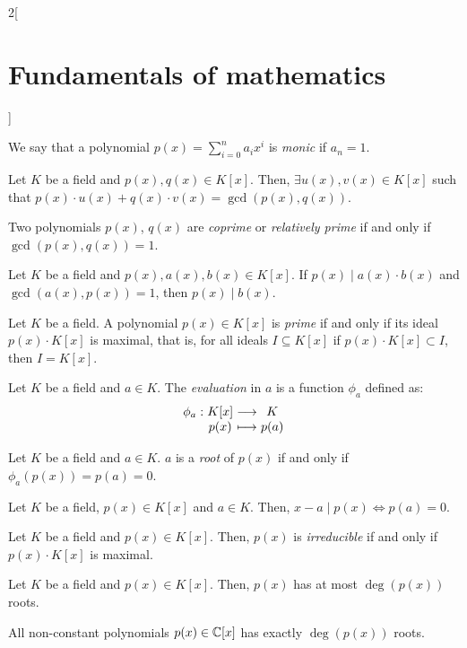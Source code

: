\documentclass[../../../main_math.tex]{subfiles}
\begin{document}
\begin{multicols}{2}[\section{Fundamentals of mathematics}]
\begin{definition}
  \end{definition}
  \begin{definition}
    We say that a polynomial $p(x)=\sum_{i=0}^na_ix^i$ is \emph{monic} if $a_n=1$.
  \end{definition}
  \begin{theorem}
    Let $K$ be a field and $p(x),q(x)\in K[x]$. Then, $\exists u(x), v(x)\in K[x]$ such that $p(x)\cdot u(x)+q(x)\cdot v(x)=\gcd(p(x),q(x))$.
  \end{theorem}
  \begin{definition}
    Two polynomials $p(x)$, $q(x)$ are \emph{coprime} or \emph{relatively prime} if and only if $\gcd(p(x),q(x))=1$.
  \end{definition}
  \begin{theorem}
    Let $K$ be a field and $p(x),a(x),b(x)\in K[x]$. If $p(x)\mid a(x)\cdot b(x)$ and $\gcd(a(x),p(x))=1$, then $p(x)\mid b(x)$.
  \end{theorem}
  \begin{definition}
    Let $K$ be a field. A polynomial $p(x)\in K[x]$ is \emph{prime} if and only if its ideal $p(x)\cdot K[x]$ is maximal, that is, for all ideals $I\subseteq K[x]$ if $p(x)\cdot K[x] \subset I$, then $I=K[x]$.
  \end{definition}
  \begin{definition}
    Let $K$ be a field and $a\in K$. The \emph{evaluation} in $a$ is a function $\phi_a$ defined as:
    $$\function{\phi_a}{K[x]}{K}{p(x)}{p(a)}$$
  \end{definition}
  \begin{definition}
    Let $K$ be a field and $a\in K$. $a$ is a \emph{root} of $p(x)$ if and only if $\phi_a(p(x))=p(a)=0$.
  \end{definition}
  \begin{theorem}
    Let $K$ be a field, $p(x)\in K[x]$ and $a\in K$. Then, $x-a\mid p(x)\iff p(a)=0$.
  \end{theorem}
  \begin{definition}
    Let $K$ be a field and $p(x)\in K[x]$. Then, $p(x)$ is \emph{irreducible} if and only if $p(x)\cdot K[x]$ is maximal.
  \end{definition}
  \begin{theorem}
    Let $K$ be a field and $p(x)\in K[x]$. Then, $p(x)$ has at most $\deg(p(x))$ roots.
  \end{theorem}
  \begin{theorem}
    All non-constant polynomials $p(x)\in\mathbb{C}[x]$ has exactly $\deg(p(x))$ roots.

\end{theorem}
\end{multicols}
\end{document}
